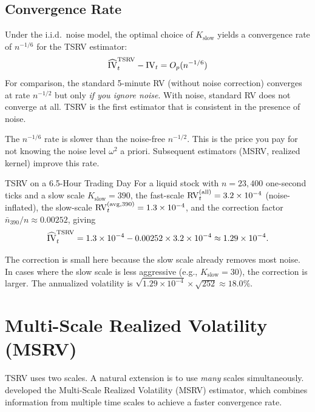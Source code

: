 \subsection{Convergence Rate}

\begin{keyresult}
Under the i.i.d.\ noise model, the optimal choice of $K_{\text{slow}}$ yields a convergence rate of $n^{-1/6}$ for the TSRV estimator:
\[
  \widehat{\operatorname{IV}}_t^{\text{TSRV}} - \operatorname{IV}_t = O_p(n^{-1/6})
\]
For comparison, the standard 5-minute RV (without noise correction) converges at rate $n^{-1/2}$ but only \emph{if you ignore noise}.
With noise, standard RV does not converge at all.
TSRV is the first estimator that is consistent in the presence of noise.
\end{keyresult}

The $n^{-1/6}$ rate is slower than the noise-free $n^{-1/2}$.
This is the price you pay for not knowing the noise level $\omega^2$ a priori.
Subsequent estimators (MSRV, realized kernel) improve this rate.

\begin{workedexample}{TSRV on a 6.5-Hour Trading Day}
For a liquid stock with $n = 23{,}400$ one-second ticks and a slow scale $K_{\text{slow}} = 390$, the fast-scale $\operatorname{RV}^{(\text{all})}_t = 3.2 \times 10^{-4}$ (noise-inflated), the slow-scale $\operatorname{RV}^{(\text{avg}, 390)}_t = 1.3 \times 10^{-4}$, and the correction factor $\bar{n}_{390}/n \approx 0.00252$, giving
\[
  \widehat{\operatorname{IV}}_t^{\text{TSRV}} = 1.3 \times 10^{-4} - 0.00252 \times 3.2 \times 10^{-4} \approx 1.29 \times 10^{-4}.
\]

The correction is small here because the slow scale already removes most noise.
In cases where the slow scale is less aggressive (e.g., $K_{\text{slow}} = 30$), the correction is larger.
The annualized volatility is $\sqrt{1.29 \times 10^{-4}} \times \sqrt{252} \approx 18.0\%$.
\end{workedexample}


\section{Multi-Scale Realized Volatility (MSRV)}
\label{sec:msrv}

TSRV uses two scales.
A natural extension is to use \emph{many} scales simultaneously.
\citet{Zhang2006} developed the Multi-Scale Realized Volatility (MSRV) estimator, which combines information from multiple time scales to achieve a faster convergence rate.


